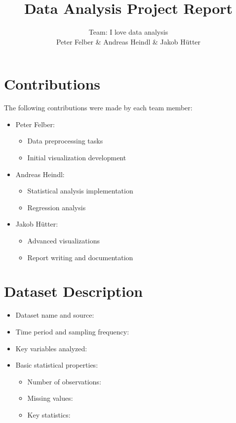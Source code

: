 \documentclass[11pt]{article}
\title{Data Analysis Project Report}
\author{
  Team: I love data analysis\\ 
  Peter Felber \& Andreas Heindl \& Jakob Hütter
}
\date{}
\begin{document}
\maketitle

\begin{center}
\end{center}

\section{Contributions}
The following contributions were made by each team member:
\begin{itemize}
    \item Peter Felber:
    \begin{itemize}
        \item Data preprocessing tasks
        \item Initial visualization development
    \end{itemize}
    \item Andreas Heindl:
    \begin{itemize}
        \item Statistical analysis implementation
        \item Regression analysis
    \end{itemize}
    \item Jakob Hütter:
    \begin{itemize}
        \item Advanced visualizations
        \item Report writing and documentation
    \end{itemize}
\end{itemize}

\section{Dataset Description}
\begin{itemize}
    \item Dataset name and source:
    \item Time period and sampling frequency:
    \item Key variables analyzed:
    \item Basic statistical properties:
    \begin{itemize}
        \item Number of observations:
        \item Missing values:
        \item Key statistics:
    \end{itemize}
\end{itemize}
\end{document}

